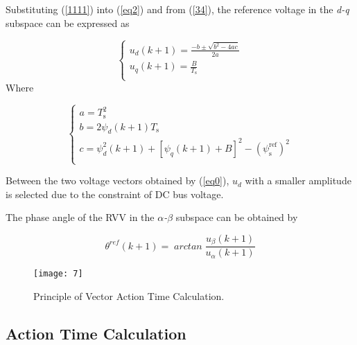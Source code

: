 \documentclass[sn-basic]{sn-jnl}
\theoremstyle{thmstyleone}%
\theoremstyle{thmstyletwo}%
\theoremstyle{thmstylethree}%
\theoremstyle{thmstyleone}%
\begin{document}
Substituting {(\ref{1111})} into {(\ref{eq2}) and from {(\ref{34})}}, the reference voltage in the \textit{d-q} subspace can be expressed as


\begin{equation}\label{eq0}
\left\{ \begin{array}{*{35}{l}}
   {{u}_{d}}\left( k+1 \right)=\frac{-b\pm \sqrt{{{b}^{2}}-4ac}}{2a}  \\
   {{u}_{q}}\left( k+1 \right)=\frac{B}{{{T}_{\text{s}}}}  \\
\end{array} \right.
\end{equation}
Where

\begin{equation}
\left\{ \begin{array}{*{35}{l}}
   a=T_{\text{s}}^{2}  \\
   b=2{{\psi }_{d}}\left( k+1 \right){{T}_{\text{s}}}  \\
   c=\psi _{d}^{2}\left( k+1 \right)+{{\left[ {{\psi }_{q}}\left( k+1 \right)+B \right]}^{2}}-{{\left( \psi _{\text{s}}^{\text{ref}} \right)}^{2}}  \\
\end{array} \right.
\end{equation}
 

 Between the two voltage vectors obtained by {(\ref{eq0})}, $u_d$ with a smaller amplitude is selected due to the constraint of DC bus voltage.

The phase angle of the RVV in the \textit{$\alpha$-$\beta$} subspace can be obtained by

\begin{equation}\label{eq5}
\theta^{ref}\left( {k + 1} \right) = {\mathit{\arctan}\frac{u_{\beta}\left( {k + 1} \right)}{u_{\alpha}\left( {k + 1} \right)}}
\end{equation}

\begin{figure}[h]
\centering
\texttt{[image: 7]}
\caption{Principle of Vector Action Time Calculation.}
\label{fig_7}
\end{figure}

\subsection{Action Time Calculation}
\end{document}
